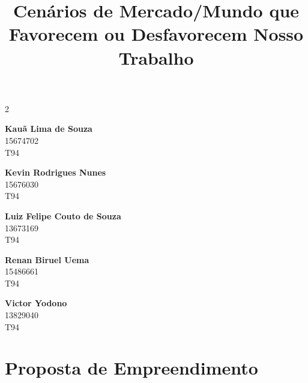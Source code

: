 \documentclass[a4paper]{article}
\title{
    \textbf{Cenários de Mercado/Mundo que Favorecem ou Desfavorecem Nosso Trabalho}
}
\date{}
\begin{document}
\maketitle
\vspace{-1.5cm}
\thispagestyle{firstpage}


\begin{multicols}{2}
    \centering

    \textbf{Kauã Lima de Souza}\\
    15674702\\
    T94

    \vspace{0.5cm}

    \textbf{Kevin Rodrigues Nunes}\\
    15676030\\
    T94

    \vspace{0.5cm}

    \textbf{Luiz Felipe Couto de Souza}\\
    13673169\\
    T94

    \vspace{0.5cm}

    \textbf{Renan Biruel Uema}\\
    15486661\\
    T94

\end{multicols}

\vspace{-0.2cm} %

\begin{center}
    \textbf{Victor Yodono}\\
    13829040\\
    T94
\end{center}

\vspace{0.5cm}


\singlespacing
\setlength{\parskip}{6pt}
\setlength{\parindent}{0.5cm}

\section{Proposta de Empreendimento}
\end{document}
